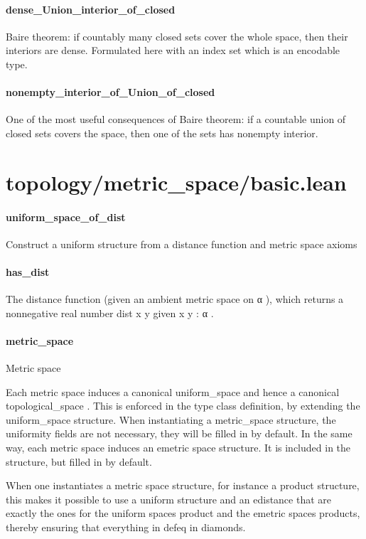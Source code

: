 \documentclass{article}
\begin{document}
\paragraph{dense\_Union\_interior\_of\_closed}
\par
Baire theorem: if countably many closed sets cover the whole space, then their interiors
are dense. Formulated here with an index set which is an encodable type.
\paragraph{nonempty\_interior\_of\_Union\_of\_closed}
\par
One of the most useful consequences of Baire theorem: if a countable union of closed sets
covers the space, then one of the sets has nonempty interior.
\section{topology/metric\_space/basic.lean}\paragraph{uniform\_space\_of\_dist}
\par
Construct a uniform structure from a distance function and metric space axioms
\paragraph{has\_dist}
\par
The distance function (given an ambient metric space on 
\colorbox[RGB]{253,246,227}{{{{\color[RGB]{101, 123, 131} α }}}}), which returns
a nonnegative real number 
\colorbox[RGB]{253,246,227}{{{{\color[RGB]{101, 123, 131} dist x y }}}} given 
\colorbox[RGB]{253,246,227}{{{{\color[RGB]{101, 123, 131} x y : α }}}}.
\paragraph{metric\_space}
\par
Metric space
\par
Each metric space induces a canonical 
\colorbox[RGB]{253,246,227}{{{{\color[RGB]{101, 123, 131} uniform\_space }}}} and hence a canonical 
\colorbox[RGB]{253,246,227}{{{{\color[RGB]{101, 123, 131} topological\_space }}}}.
This is enforced in the type class definition, by extending the 
\colorbox[RGB]{253,246,227}{{{{\color[RGB]{101, 123, 131} uniform\_space }}}} structure. When
instantiating a 
\colorbox[RGB]{253,246,227}{{{{\color[RGB]{101, 123, 131} metric\_space }}}} structure, the uniformity fields are not necessary, they will be
filled in by default. In the same way, each metric space induces an emetric space structure.
It is included in the structure, but filled in by default.
\par
When one instantiates a metric space structure, for instance a product structure,
this makes it possible to use a uniform structure and an edistance that are exactly
the ones for the uniform spaces product and the emetric spaces products, thereby
ensuring that everything in defeq in diamonds.
\end{document}
